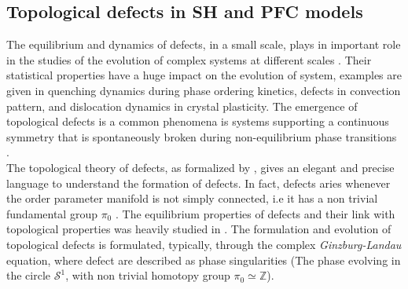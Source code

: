 \documentclass[11pt]{article}
\begin{document}
\subsection{Topological defects in SH and PFC models}
The equilibrium and dynamics of defects, in a small scale, plays in important role in the studies of the evolution of complex systems at different scales \parencite{anghelutaAnisotropicvelocity2012}. Their statistical properties have a huge impact on the evolution of system, examples are given in quenching dynamics during phase ordering kinetics, defects in convection pattern, and dislocation dynamics in crystal plasticity. The emergence of topological defects is a common phenomena is systems supporting a continuous symmetry that is spontaneously broken during non-equilibrium phase transitions \parencite{anghelutaAnisotropicvelocity2012}. \\
The topological theory of defects, as formalized by \parencite{mermintopologicaltheory1979}, gives an elegant and precise language to understand the formation of defects. In fact, defects aries whenever the order parameter manifold is not simply connected, i.e it has a non trivial fundamental group $\pi_0$ \parencite{pismenVorticesNonlinear1999}. The equilibrium properties of defects and their link with topological properties was heavily studied in \parencite{pismenVorticesNonlinear1999}. The formulation and evolution of topological defects is formulated, typically, through the complex \emph{Ginzburg-Landau} equation, where defect are described as phase singularities (The phase evolving in the circle $\mathcal{S}^1$, with non trivial homotopy group $\pi_0\simeq  \mathbb{Z}$).
\end{document}
